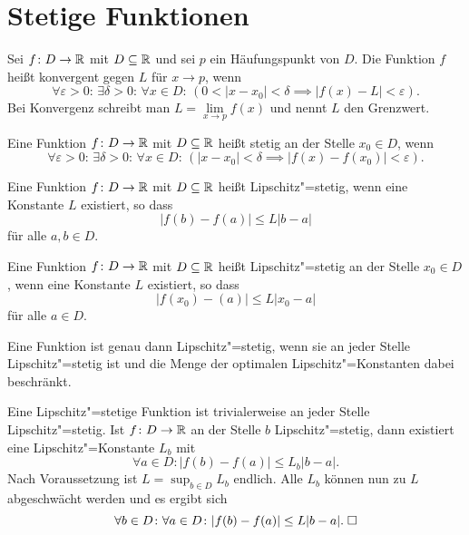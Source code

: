 \newpage
\section{Stetige Funktionen}

\begin{Definition}\label{fn-lim}
Sei $f\colon D\to\mathbb R$ mit $D\subseteq\mathbb R$ und sei $p$ ein
Häufungspunkt von $D$. Die Funktion $f$ heißt konvergent
gegen $L$ für $x\to p$, wenn%
\[\forall \varepsilon{>}0\colon\,\exists \delta{>}0\colon\,\forall x{\in}D\colon\,
(0<|x-x_0|<\delta\implies |f(x)-L|<\varepsilon).\]
Bei Konvergenz schreibt man $L=\lim\limits_{x\to p} f(x)$ und nennt $L$ den Grenzwert.
\end{Definition}

\begin{Definition}\label{cont}
Eine Funktion $f\colon D\to\mathbb R$ mit $D\subseteq\mathbb R$ heißt stetig an der
Stelle $x_0\in D$, wenn
\[\forall \varepsilon{>}0\colon\,\exists \delta{>}0\colon\,\forall x{\in}D\colon\,
(|x-x_0|<\delta\implies |f(x)-f(x_0)|<\varepsilon).\]
\end{Definition}

\begin{Definition}\newlinefirst
Eine Funktion $f\colon D\to\mathbb R$ mit $D\subseteq\mathbb R$ heißt
Lipschitz"=stetig, wenn eine Konstante $L$ existiert, so dass
\[|f(b)-f(a)|\le L|b-a|\]
für alle $a,b\in D$.
\end{Definition}

\begin{Definition}%
\label{Lipschitz-cont-at}\newlinefirst
Eine Funktion $f\colon D\to\mathbb R$ mit $D\subseteq\mathbb R$ heißt
Lipschitz"=stetig an der Stelle $x_0\in D$, wenn eine Konstante $L$
existiert, so dass
\[|f(x_0)-(a)|\le L|x_0-a|\]
für alle $a\in D$.
\end{Definition}

\begin{Korollar}
Eine Funktion ist genau dann Lipschitz"=stetig, wenn sie an jeder
Stelle Lipschitz"=stetig ist und die Menge der optimalen
Lipschitz"=Konstanten dabei beschränkt.
\end{Korollar}
\begin{Beweis}
Eine Lipschitz"=stetige Funktion ist trivialerweise an jeder Stelle
Lipschitz"=stetig. Ist $f\colon D\to\mathbb R$ an der Stelle $b$ Lipschitz"=stetig,
dann existiert eine Lipschitz"=Konstante $L_b$ mit%
\[\forall a\in D\colon |f(b)-f(a)|\le L_b |b-a|.\]
Nach Voraussetzung ist $L=\sup_{b\in D} L_b$ endlich. Alle $L_b$ können
nun zu $L$ abgeschwächt werden und es ergibt sich%
\[\forall b\in D\colon\forall a\in D\colon |f(b)-f(a)|\le L|b-a|.\;\square\]
\end{Beweis}


